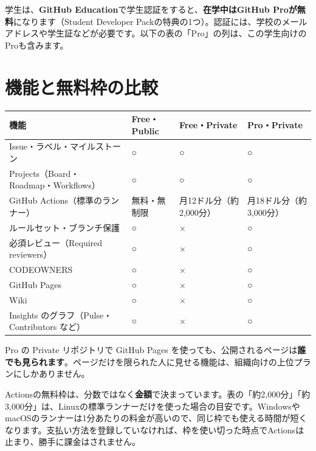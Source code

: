 \documentclass[book, paper=a4, fontsize=10.5pt, titlepage]{jlreq}
\begin{document}
学生は、\textbf{GitHub Education}で学生認証をすると、\textbf{在学中はGitHub Proが無料}になります（Student Developer Packの特典の1つ）。認証には、学校のメールアドレスや学生証などが必要です。以下の表の「Pro」の列は、この学生向けのProも含みます。

\section{機能と無料枠の比較}

\begin{center}
\begin{tabularx}{\linewidth}{@{}X >{\centering\arraybackslash}p{2.4cm} >{\centering\arraybackslash}p{2.4cm} >{\centering\arraybackslash}p{2.4cm}@{}}
\toprule
機能 & Free・Public & Free・Private & Pro・Private \\
\midrule
Issue・ラベル・マイルストーン & ○ & ○ & ○ \\
Projects（Board・Roadmap・Workflows） & ○ & ○ & ○ \\
\addlinespace[3pt]
GitHub Actions（標準のランナー） & 無料・無制限 & 月12ドル分（約2,000分） & 月18ドル分（約3,000分） \\
\addlinespace[3pt]
ルールセット・ブランチ保護 & ○ & × & ○ \\
必須レビュー（Required reviewers） & ○ & × & ○ \\
CODEOWNERS & ○ & × & ○ \\
\addlinespace[3pt]
GitHub Pages & ○ & × & ○ \\
Wiki & ○ & × & ○ \\
Insights のグラフ（Pulse・Contributors など） & ○ & × & ○ \\
\bottomrule
\end{tabularx}
\end{center}

\medskip

Pro の Private リポジトリで GitHub Pages を使っても、公開されるページは\textbf{誰でも見られます}。ページだけを限られた人に見せる機能は、組織向けの上位プランにしかありません。

\begin{notebox}
Actionsの無料枠は、分数ではなく\textbf{金額}で決まっています。表の「約2,000分」「約3,000分」は、Linuxの標準ランナーだけを使った場合の目安です。WindowsやmacOSのランナーは1分あたりの料金が高いので、同じ枠でも使える時間が短くなります。支払い方法を登録していなければ、枠を使い切った時点でActionsは止まり、勝手に課金はされません。
\end{notebox}
\end{document}
